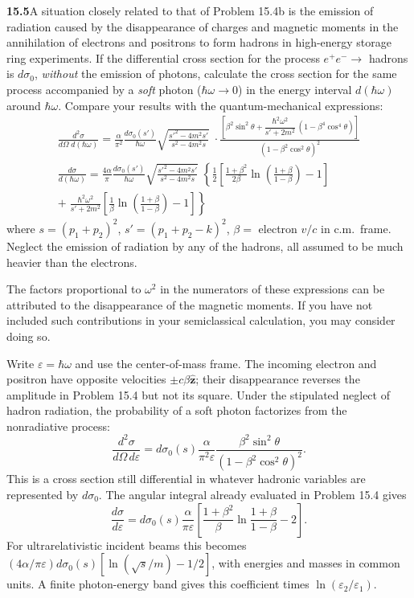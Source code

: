 \par\bigskip
\noindent\textbf{15.5}\quad A situation closely related to that of Problem 15.4b is the emission of radiation caused by the disappearance of charges and magnetic moments in the annihilation of electrons and positrons to form hadrons in high-energy storage ring experiments. If the differential cross section for the process $e^{+}e^{-}\to$ hadrons is $d\sigma_{0}$, \emph{without} the emission of photons, calculate the cross section for the same process accompanied by a \emph{soft} photon ($\hbar\omega\to0$) in the energy interval $d(\hbar\omega)$ around $\hbar\omega$. Compare your results with the quantum-mechanical expressions:
\begin{gather*}
\frac{d^{2}\sigma}{d\Omega\;d(\hbar\omega)}=\frac{\alpha}{\pi^{2}}\frac{d\sigma_{0}(s')}{\hbar\omega}\sqrt{\frac{s'^{2}-4m^{2}s'}{s^{2}-4m^{2}s}}\;
\cdot\frac{\left[\beta^{2}\sin^{2}\theta+\dfrac{\hbar^{2}\omega^{2}}{s'+2m^{2}}\,(1-\beta^{4}\cos^{4}\theta)\right]}{(1-\beta^{2}\cos^{2}\theta)^{2}}\\[8pt]
\frac{d\sigma}{d(\hbar\omega)}=\frac{4\alpha}{\pi}\frac{d\sigma_{0}(s')}{\hbar\omega}\sqrt{\frac{s'^{2}-4m^{2}s'}{s^{2}-4m^{2}s}}\;
\left\{\frac{1}{2}\left[\frac{1+\beta^{2}}{2\beta}\ln\!\left(\frac{1+\beta}{1-\beta}\right)-1\right]\right.\\[6pt]
\left.+\;\frac{\hbar^{2}\omega^{2}}{s'+2m^{2}}\left[\frac{1}{\beta}\ln\!\left(\frac{1+\beta}{1-\beta}\right)-1\right]\right\}
\end{gather*}
where $s=(p_{1}+p_{2})^{2}$, $s'=(p_{1}+p_{2}-k)^{2}$, $\beta=$ electron $v/c$ in c.m.\ frame. Neglect the emission of radiation by any of the hadrons, all assumed to be much heavier than the electrons.

The factors proportional to $\omega^{2}$ in the numerators of these expressions can be attributed to the disappearance of the magnetic moments. If you have not included such contributions in your semiclassical calculation, you may consider doing so.
\solution

Write $\varepsilon=\hbar\omega$ and use the center-of-mass frame.
The incoming electron and positron have opposite velocities
$\pm c\beta\widehat{\mathbf z}$; their disappearance reverses the
amplitude in Problem 15.4 but not its square.  Under the stipulated
neglect of hadron radiation, the probability of a soft photon
factorizes from the nonradiative process:
\[
\boxed{\frac{d^2\sigma}{d\Omega\,d\varepsilon}
=d\sigma_0(s)\frac{\alpha}{\pi^2\varepsilon}
 \frac{\beta^2\sin^2\theta}{(1-\beta^2\cos^2\theta)^2}.}
\]
This is a cross section still differential in whatever hadronic
variables are represented by $d\sigma_0$.  The angular integral
already evaluated in Problem 15.4 gives
\[
\boxed{\frac{d\sigma}{d\varepsilon}
=d\sigma_0(s)\frac{\alpha}{\pi\varepsilon}
 \left[\frac{1+\beta^2}{\beta}
 \ln\frac{1+\beta}{1-\beta}-2\right].}
\]
For ultrarelativistic incident beams this becomes
$(4\alpha/\pi\varepsilon)d\sigma_0(s)
[\ln(\sqrt{s}/m)-1/2]$, with energies and masses in common units.
A finite photon-energy band gives this coefficient times
$\ln(\varepsilon_2/\varepsilon_1)$.

